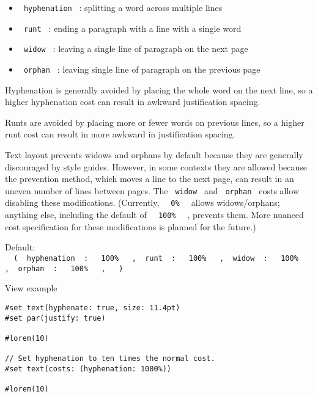 \begin{itemize}
\tightlist
\item
  \texttt{\ hyphenation\ } : splitting a word across multiple lines
\item
  \texttt{\ runt\ } : ending a paragraph with a line with a single word
\item
  \texttt{\ widow\ } : leaving a single line of paragraph on the next
  page
\item
  \texttt{\ orphan\ } : leaving single line of paragraph on the previous
  page
\end{itemize}

Hyphenation is generally avoided by placing the whole word on the next
line, so a higher hyphenation cost can result in awkward justification
spacing.

Runts are avoided by placing more or fewer words on previous lines, so a
higher runt cost can result in more awkward in justification spacing.

Text layout prevents widows and orphans by default because they are
generally discouraged by style guides. However, in some contexts they
are allowed because the prevention method, which moves a line to the
next page, can result in an uneven number of lines between pages. The
\texttt{\ widow\ } and \texttt{\ orphan\ } costs allow disabling these
modifications. (Currently, \texttt{\ }{\texttt{\ 0\%\ }}\texttt{\ }
allows widows/orphans; anything else, including the default of
\texttt{\ }{\texttt{\ 100\%\ }}\texttt{\ } , prevents them. More nuanced
cost specification for these modifications is planned for the future.)

Default:
\texttt{\ }{\texttt{\ (\ }}\texttt{\ hyphenation\ }{\texttt{\ :\ }}\texttt{\ }{\texttt{\ 100\%\ }}\texttt{\ }{\texttt{\ ,\ }}\texttt{\ runt\ }{\texttt{\ :\ }}\texttt{\ }{\texttt{\ 100\%\ }}\texttt{\ }{\texttt{\ ,\ }}\texttt{\ widow\ }{\texttt{\ :\ }}\texttt{\ }{\texttt{\ 100\%\ }}\texttt{\ }{\texttt{\ ,\ }}\texttt{\ orphan\ }{\texttt{\ :\ }}\texttt{\ }{\texttt{\ 100\%\ }}\texttt{\ }{\texttt{\ ,\ }}\texttt{\ }{\texttt{\ )\ }}\texttt{\ }


View example

\begin{verbatim}
#set text(hyphenate: true, size: 11.4pt)
#set par(justify: true)

#lorem(10)

// Set hyphenation to ten times the normal cost.
#set text(costs: (hyphenation: 1000%))

#lorem(10)
\end{verbatim}

